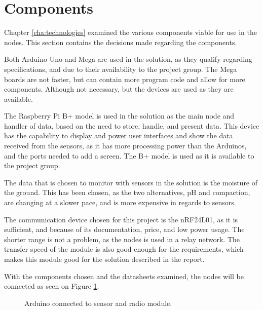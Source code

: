 \section{Components}
Chapter \ref{cha:technologies} examined the various components viable for use in the nodes. This section contains the decisions made regarding the components.

Both Arduino Uno and Mega are used in the solution, as they qualify regarding specifications, and due to their availability to the project group. The Mega boards are not faster, but can contain more program code and allow for more components. Although not necessary, but the devices are used as they are available.

The Raspberry Pi B+ model is used in the solution as the main node and handler of data, based on the need to store, handle, and present data.  This device has the capability to display and power user interfaces and show the data received from the sensors, as it has more processing power than the Arduinos, and the ports needed to add a screen. The B+ model is used as it is available to the project group.

The data that is chosen to monitor with sensors in the solution is the moisture of the ground. This has been chosen, as the two alternatives, pH and compaction, are changing at a slower pace, and is more expensive in regards to sensors.

The communication device chosen for this project is the nRF24L01, as it is sufficient, and because of its documentation, price, and low power usage. The shorter range is not a problem, as the nodes is used in a relay network. The transfer speed of the module is also good enough for the requirements, which makes this module good for the solution described in the report.

With the components chosen and the datasheets examined, the nodes will be connected as seen on Figure \ref{fig:compsketch}.

\begin{figure}[!h]
	\centering
	\caption{Arduino connected to sensor and radio module.}
	\label{fig:compsketch}
\end{figure}

